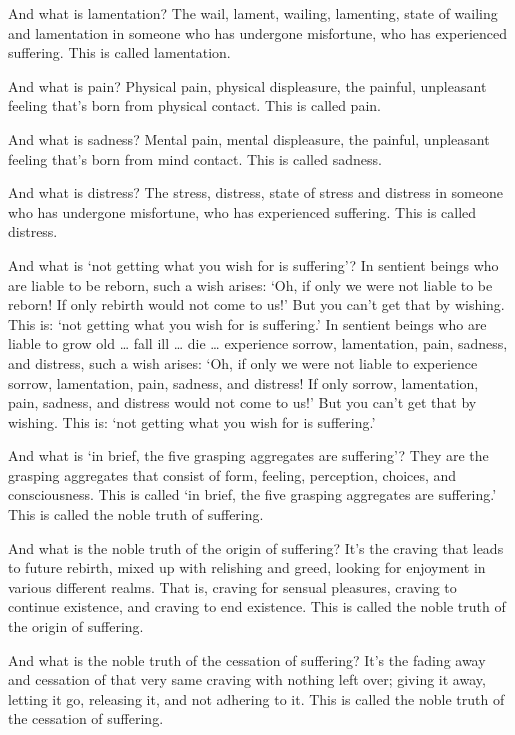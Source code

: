 \documentclass[12pt,openany]{book}%
\begin{document}
And what is lamentation? The wail, lament, wailing, lamenting, state of wailing and lamentation in someone who has undergone misfortune, who has experienced suffering. This is called lamentation. 

And what is pain? Physical pain, physical displeasure, the painful, unpleasant feeling that’s born from physical contact. This is called pain. 

And what is sadness? Mental pain, mental displeasure, the painful, unpleasant feeling that’s born from mind contact. This is called sadness. 

And what is distress? The stress, distress, state of stress and distress in someone who has undergone misfortune, who has experienced suffering. This is called distress. 

And what is ‘not getting what you wish for is suffering’? In sentient beings who are liable to be reborn, such a wish arises: ‘Oh, if only we were not liable to be reborn! If only rebirth would not come to us!’ But you can’t get that by wishing. This is: ‘not getting what you wish for is suffering.’ In sentient beings who are liable to grow old … fall ill … die … experience sorrow, lamentation, pain, sadness, and distress, such a wish arises: ‘Oh, if only we were not liable to experience sorrow, lamentation, pain, sadness, and distress! If only sorrow, lamentation, pain, sadness, and distress would not come to us!’ But you can’t get that by wishing. This is: ‘not getting what you wish for is suffering.’ 

And what is ‘in brief, the five grasping aggregates are suffering’? They are the grasping aggregates that consist of form, feeling, perception, choices, and consciousness. This is called ‘in brief, the five grasping aggregates are suffering.’ This is called the noble truth of suffering. 

And what is the noble truth of the origin of suffering? It’s the craving that leads to future rebirth, mixed up with relishing and greed, looking for enjoyment in various different realms. That is, craving for sensual pleasures, craving to continue existence, and craving to end existence. This is called the noble truth of the origin of suffering. 

And what is the noble truth of the cessation of suffering? It’s the fading away and cessation of that very same craving with nothing left over; giving it away, letting it go, releasing it, and not adhering to it. This is called the noble truth of the cessation of suffering. 
\end{document}
